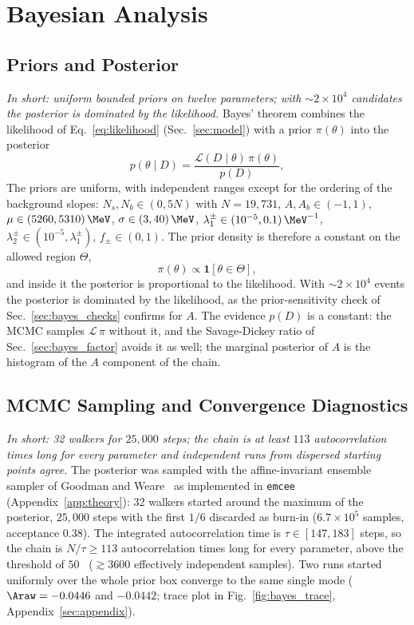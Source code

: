 \section{Bayesian Analysis}
\label{sec:bayesian}

\subsection{Priors and Posterior}
\label{sec:bayes_prior}
\emph{In short: uniform bounded priors on twelve parameters; with $\sim2\times10^4$ candidates the posterior is dominated by the likelihood.}
Bayes' theorem combines the likelihood of Eq.~\eqref{eq:likelihood} (Sec.~\ref{sec:model}) with a prior $\pi(\theta)$ into the posterior
\begin{equation}
p(\theta\mid D)=\frac{\mathcal{L}(D\mid\theta)\,\pi(\theta)}{p(D)},
\label{eq:bayes}
\end{equation}
The priors are uniform, with independent ranges except for the ordering of the background slopes: $N_s,N_b\in(0,5N)$ with $N=19{,}731$, $A,A_b\in(-1,1)$, $\mu\in(5260,5310)\,\MeV$, $\sigma\in(3,40)\,\MeV$, $\lambda_1^{\pm}\in(10^{-5},0.1)\,\MeV^{-1}$, $\lambda_2^{\pm}\in(10^{-5},\lambda_1^{\pm})$, $f_{\pm}\in(0,1)$. The prior density is therefore a constant on the allowed region $\Theta$,
\begin{equation}
\pi(\theta)\propto\mathbf{1}\left[\theta\in\Theta\right],
\label{eq:prior}
\end{equation}
and inside it the posterior is proportional to the likelihood. With $\sim$$2\times10^4$ events the posterior is dominated by the likelihood, as the prior-sensitivity check of Sec.~\ref{sec:bayes_checks} confirms for $A$. The evidence $p(D)$ is a constant: the MCMC samples $\mathcal{L}\,\pi$ without it, and the Savage-Dickey ratio of Sec.~\ref{sec:bayes_factor} avoids it as well; the marginal posterior of $A$ is the histogram of the $A$ component of the chain.

\subsection{MCMC Sampling and Convergence Diagnostics}
\label{sec:bayes_mcmc}
\emph{In short: 32 walkers for $25{,}000$ steps; the chain is at least $113$ autocorrelation times long for every parameter and independent runs from dispersed starting points agree.}
The posterior was sampled with the affine-invariant ensemble sampler of Goodman and Weare~\cite{goodman_weare} as implemented in \texttt{emcee}~\cite{emcee} (Appendix~\ref{app:theory}): 32 walkers started around the maximum of the posterior, $25{,}000$ steps with the first $1/6$ discarded as burn-in ($6.7\times10^5$ samples, acceptance $0.38$). The integrated autocorrelation time is $\tau\in[147,183]$ steps, so the chain is $N/\tau\geq113$ autocorrelation times long for every parameter, above the threshold of $50$~\cite{emcee} ($\gtrsim3600$ effectively independent samples). Two runs started uniformly over the whole prior box converge to the same single mode ($\Araw=-0.0446$ and $-0.0442$; trace plot in Fig.~\ref{fig:bayes_trace}, Appendix~\ref{sec:appendix}).

